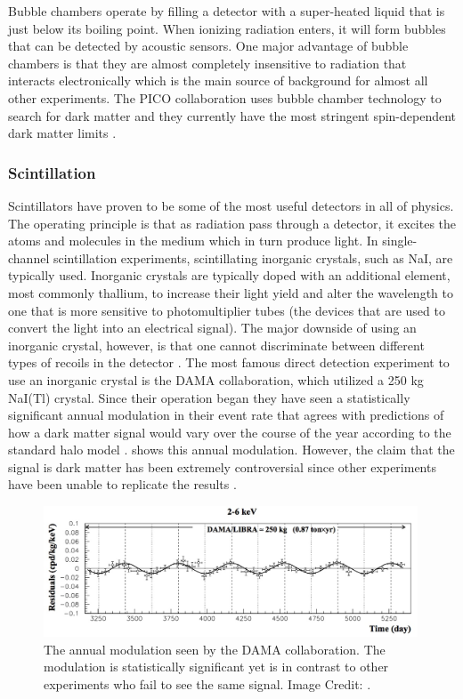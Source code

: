 Bubble chambers operate by filling a detector with a super-heated liquid that is just below its boiling point.  When ionizing radiation enters, it will form bubbles that can be detected by acoustic sensors.  One major advantage of bubble chambers is that they are almost completely insensitive to radiation that interacts electronically which is the main source of background for almost all other experiments.  The PICO collaboration uses bubble chamber technology to search for dark matter and they currently have the most stringent spin-dependent dark matter limits \cite{amole2017dark}.  

\subsubsection{Scintillation}

Scintillators have proven to be some of the most useful detectors in all of physics.  The operating principle is that as radiation pass through a detector, it excites the atoms and molecules in the medium which in turn produce light.  In single-channel scintillation experiments, scintillating inorganic crystals, such as NaI, are typically used.  Inorganic crystals are typically doped with an additional element, most commonly thallium, to increase their light yield and alter the wavelength to one that is more sensitive to photomultiplier tubes (the devices that are used to convert the light into an electrical signal).  The major downside of using an inorganic crystal, however, is that one cannot discriminate between different types of recoils in the detector \cite{undagoitia2015dark}.  The most famous direct detection experiment to use an inorganic crystal is the DAMA collaboration, which utilized a 250 kg NaI(Tl) crystal.  Since their operation began they have seen a statistically significant annual modulation in their event rate that agrees with predictions of how a dark matter signal would vary over the course of the year according to the standard halo model \cite{bernabei2010particle}.    shows this annual modulation.  However, the claim that the signal is dark matter has been extremely controversial since other experiments have been unable to replicate the results \cite{aalseth2014maximum, xmass2016direct, aprile2017search}.

\begin{figure}[t]
	\centering
	\includegraphics[width=0.99\textwidth]{dama_modulation}
	\caption{The annual modulation seen by the DAMA collaboration.  The modulation is statistically significant yet is in contrast to other experiments who fail to see the same signal. Image Credit: \cite{undagoitia2015dark}.}
	\label{fig:dama_modulation}
\end{figure}

